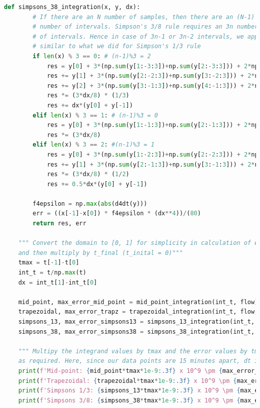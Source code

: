\begin{lstlisting}[language=Python, caption=Code implementing different integration techniques and their associated errors]
    def simpsons_38_integration(x, y, dx):
        # If there are an N number of samples, then there are an (N-1)
        # number of intervals. Simpson's 3/8 rule requires an 3n number
        # of intervals. Hence in case of 3n-1 or 3n-2 intervals, we approximate the end points
        # similar to what we did for Simpson's 1/3 rule
        if len(x) % 3 == 0: # (n-1)%3 = 2
            res = y[0] + 3*(np.sum(y[1:-3:3])+np.sum(y[2:-3:3])) + 2*np.sum(y[3:-3:3])+ y[-3]
            res += y[1] + 3*(np.sum(y[2:-2:3])+np.sum(y[3:-2:3])) + 2*np.sum(y[4:-2:3])+ y[-2]
            res += y[2] + 3*(np.sum(y[3:-1:3])+np.sum(y[4:-1:3])) + 2*np.sum(y[5:-1:3])+ y[-1]
            res *= (3*dx/8) * (1/3)
            res += dx*(y[0] + y[-1])
        elif len(x) % 3 == 1: # (n-1)%3 = 0
            res = y[0] + 3*(np.sum(y[1:-1:3])+np.sum(y[2:-1:3])) + 2*np.sum(y[3:-1:3])+ y[-1]
            res *= (3*dx/8)
        elif len(x) % 3 == 2: #(n-1)%3 = 1
            res = y[0] + 3*(np.sum(y[1:-2:3])+np.sum(y[2:-2:3])) + 2*np.sum(y[3:-2:3])+ y[-2]
            res += y[1] + 3*(np.sum(y[2:-1:3])+np.sum(y[3:-1:3])) + 2*np.sum(y[4:-1:3])+ y[-1]
            res *= (3*dx/8) * (1/2)
            res += 0.5*dx*(y[0] + y[-1])
    
        f4epsilon = np.max(abs(d4dt(y)))
        err = ((x[-1]-x[0]) * f4epsilon * (dx**4))/(80)
        return res, err
    
    """ Convert the domain to [0, 1] for simplicity in calculation of errors 
    and then multiply by t_final (t_inital = 0)"""
    tmax = t[-1]-t[0]
    int_t = t/np.max(t)
    dx = int_t[1]-int_t[0]
    
    mid_point, max_error_mid_point = mid_point_integration(int_t, flow)
    trapezoidal, max_error_trapz = trapezoidal_integration(int_t, flow, dx)
    simpsons_13, max_error_simpsons13 = simpsons_13_integration(int_t, flow, dx)
    simpsons_38, max_error_simpsons38 = simpsons_38_integration(int_t, flow, dx)
    
    """ Multipy the integrand values by tmax and the error values by tmax*(dt)^2 and tmax*(dt)^4 for different integration methods
    as required. Here, since our data points are 15 minutes apart, dt is taken to be 900 seconds."""
    print(f'Mid-point: {mid_point*tmax*1e-9:.3f} x 10^9 \pm {max_error_mid_point*tmax*(900**2)*1e-5:.3f} x 10^5 ft^3')
    print(f'Trapezoidal: {trapezoidal*tmax*1e-9:.3f} x 10^9 \pm {max_error_trapz*tmax*(900**2)*1e-5:.3f} x 10^5 ft^3')
    print(f'Simpsons 1/3: {simpsons_13*tmax*1e-9:.3f} x 10^9 \pm {max_error_simpsons13*tmax*(900**4):.3f} ft^3')
    print(f'Simpsons 3/8: {simpsons_38*tmax*1e-9:.3f} x 10^9 \pm {max_error_simpsons38*tmax*(900**4):.3f} ft^3')
\end{lstlisting}

